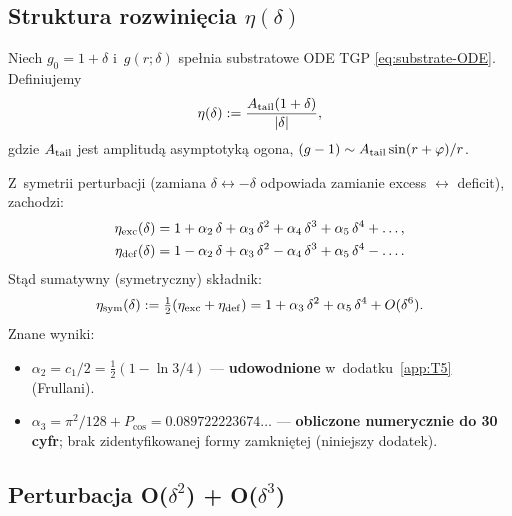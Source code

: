 \subsection{Struktura rozwini\k{e}cia $\eta(\delta)$}
\label{sec:T6-structure}

Niech $g_0 = 1 + \delta$ i~$g(r; \delta)$ spe\l{}nia substratowe ODE TGP
\eqref{eq:substrate-ODE}. Definiujemy
\begin{equation}
  \eta(\delta) := \frac{A_{\rm tail}(1+\delta)}{|\delta|},
\end{equation}
gdzie $A_{\rm tail}$ jest amplitud\k{a} asymptotyk\k{a} ogona,
$(g-1) \sim A_{\rm tail}\sin(r+\varphi)/r$.

Z~symetrii perturbacji (zamiana $\delta \leftrightarrow -\delta$
odpowiada zamianie excess $\leftrightarrow$ deficit), zachodzi:
\begin{align}
  \eta_{\rm exc}(\delta) &= 1 + \alpha_2\,\delta + \alpha_3\,\delta^2 + \alpha_4\,\delta^3 + \alpha_5\,\delta^4 + \dots, \\
  \eta_{\rm def}(\delta) &= 1 - \alpha_2\,\delta + \alpha_3\,\delta^2 - \alpha_4\,\delta^3 + \alpha_5\,\delta^4 - \dots.
\end{align}
St\k{a}d sumatywny (symetryczny) sk\l{}adnik:
\begin{equation}
  \eta_{\rm sym}(\delta) := \tfrac{1}{2}(\eta_{\rm exc} + \eta_{\rm def})
    = 1 + \alpha_3\,\delta^2 + \alpha_5\,\delta^4 + O(\delta^6).
\end{equation}
Znane wyniki:
\begin{itemize}
  \item $\alpha_2 = c_1/2 = \tfrac{1}{2}(1 - \ln 3/4)$ --- \textbf{udowodnione}
        w~dodatku~\ref{app:T5} (Frullani).
  \item $\alpha_3 = \pi^2/128 + P_{\cos} = 0.089722223674\ldots$ --- \textbf{obliczone
        numerycznie do 30 cyfr}; brak zidentyfikowanej formy zamkni\k{e}tej
        (niniejszy dodatek).
\end{itemize}

\subsection{Perturbacja O($\delta^2$) + O($\delta^3$)}
\label{sec:T6-perturbation}

